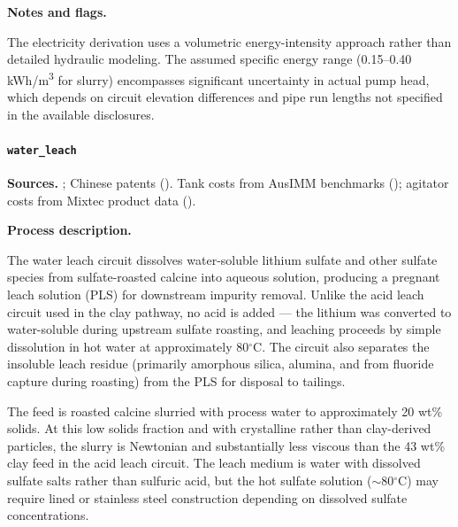 \medskip
\noindent\textbf{Notes and flags.}\quad

The electricity derivation uses a volumetric energy-intensity approach rather than detailed hydraulic modeling. The assumed specific energy range (0.15--0.40 \si{kWh/m^3} for slurry) encompasses significant uncertainty in actual pump head, which depends on circuit elevation differences and pipe run lengths not specified in the available disclosures.

\clearpage
\paragraph{\texttt{water\_leach}}\label{app:04-methods-blockdefs-waterleach}

\medskip
\noindent\textbf{Sources.}\quad
\citet{dengSystematicReviewSulfate2026, gaoLithiumExtractionHard2023, parkEffectiveLithiumExtraction2023, yanExtractionLithiumLepidolite2012}; Chinese patents (\citet{zouMethodEfficientLithium2024, nanMethodsExtractingLithium2019, nanMethodsExtractingLithium2022}). Tank costs from AusIMM benchmarks (\citet{ausimmMonograph27Cost}); agitator costs from Mixtec product data (\citet{baguleyMixtechAustraliaFluid2009}).


\medskip
\noindent\textbf{Process description.}\quad


The water leach circuit dissolves water-soluble lithium sulfate and other sulfate species from sulfate-roasted calcine into aqueous solution, producing a pregnant leach solution (PLS) for downstream impurity removal. Unlike the acid leach circuit used in the clay pathway, no acid is added --- the lithium was converted to water-soluble  during upstream sulfate roasting, and leaching proceeds by simple dissolution in hot water at approximately 80$^\circ$C. The circuit also separates the insoluble leach residue (primarily amorphous silica, alumina, and  from fluoride capture during roasting) from the PLS for disposal to tailings.

The feed is roasted calcine slurried with process water to approximately 20 wt\% solids. At this low solids fraction and with crystalline rather than clay-derived particles, the slurry is Newtonian and substantially less viscous than the 43 wt\% clay feed in the acid leach circuit. The leach medium is water with dissolved sulfate salts rather than sulfuric acid, but the hot sulfate solution ($\sim$80$^\circ$C) may require lined or stainless steel construction depending on dissolved sulfate concentrations.

